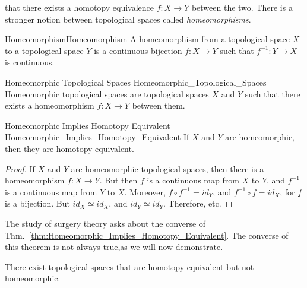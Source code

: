             that there exists a homotopy equivalence $f:X\rightarrow{Y}$
            between the two. There is a stronger notion between topological
            spaces called \textit{homeomorphisms}.
            \begin{ldefinition}{Homeomorphism}{Homeomorphism}
                A homeomorphism from a topological space $X$ to a topological
                space $Y$ is a continuous bijection $f:{X}\rightarrow{Y}$ such
                that $f^{-1}:{Y}\rightarrow{X}$ is continuous.
            \end{ldefinition}
            \begin{ldefinition}{Homeomorphic Topological Spaces}
                               {Homeomorphic_Topological_Spaces}
                Homeomorphic topological spaces are topological spaces $X$
                and $Y$ such that there exists a homeomorphism
                $f:{X}\rightarrow{Y}$ between them.
            \end{ldefinition}
            \begin{ltheorem}{Homeomorphic Implies Homotopy Equivalent}
                            {Homeomorphic_Implies_Homotopy_Equivalent}
                If $X$ and $Y$ are homeomorphic,
                then they are homotopy equivalent.
            \end{ltheorem}
            \begin{proof}
                If $X$ and $Y$ are homeomorphic topological spaces, then there
                is a homeomorphism $f:X\rightarrow Y$. But then $f$ is a
                continuous map from $X$ to $Y$, and $f^{-1}$ is a continuous
                map from $Y$ to $X$. Moreover, ${f}\circ{f^{-1}}=id_{Y}$, and
                ${f^{-1}}\circ{f}=id_{X}$, for $f$ is a bijection. But
                ${id_{X}}\simeq{id_{X}}$, and ${id_{Y}}\simeq{id_{Y}}$.
                Therefore, etc.
            \end{proof}
            The study of surgery theory asks about the
            converse of Thm.~\ref{thm:Homeomorphic_Implies_Homotopy_Equivalent}.
            The converse of this theorem is not always true,as we will now
            demonstrate.
            \begin{theorem}
                \label{thm:homotopic_does_not_imply_homeomorphic}%
                There exist topological spaces that are
                homotopy equivalent but not homeomorphic.
            \end{theorem}
